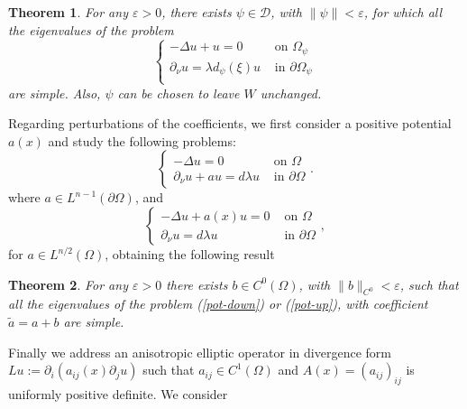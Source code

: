 \documentclass[a4paper,reqno,11pt,oneside]{amsart}
\theoremstyle{plain}
\newtheorem{thm}{Theorem}
\theoremstyle{plain}
\theoremstyle{plain}
\theoremstyle{remark}
\begin{document}
\begin{thm}
For any $\varepsilon >0$, there exists $\psi \in \mathcal{D}$, with $\|\psi\|<\varepsilon$,  for which all the eigenvalues of  the problem
\begin{equation}\label{2psisimp}
   \left\{
    \begin{array}{cc}
         -\Delta u +u=0& \text{ on } \Omega_\psi\\
        \partial_\nu u=\lambda d_\psi(\xi) u & \text{ in } \partial\Omega_\psi\\
    \end{array}
    \right.
\end{equation} 
are simple. Also, $\psi$ can be chosen to leave $W$ unchanged.
\label{thm:2-simp}
\end{thm}

Regarding perturbations of the coefficients, we first consider a positive potential $a(x)$ and study the following problems:     
\begin{equation}\label{pot-down}  
   \left\{
    \begin{array}{cc}
         -\Delta u=0& \text{ on } \Omega\\
         \partial_\nu u+ au=d\lambda u & \text{ in } \partial \Omega
    \end{array}.
    \right.
\end{equation}
where $a\in L^{n-1}(\partial\Omega)$,
  and 
  \begin{equation}\label{pot-up}  
   \left\{
    \begin{array}{cc}
         -\Delta u+a(x)u=0& \text{ on } \Omega\\
        \partial_\nu u=d\lambda u & \text{ in } \partial \Omega
    \end{array},
    \right.
\end{equation}
for $a\in L^{n/2}(\Omega)$,
obtaining the following result

\begin{thm}
\label{thm:pot}
For any $\varepsilon>0$ there exists $b\in C^{0}(\Omega)$, with $\|b\|_{C^0}<\varepsilon$, 
  such that all the eigenvalues of  the problem  (\ref{pot-down}) or (\ref{pot-up}), with coefficient $\tilde a=a+b$ are simple.
\end{thm}

Finally we address   an anisotropic elliptic operator in divergence form $Lu:=\partial_i (a_{ij}(x)\partial_j u)$ such that $a_{ij} \in C^1(\Omega)$ and $A(x)=(a_{ij})_{ij}$ is uniformly positive definite. We consider
\end{document}
